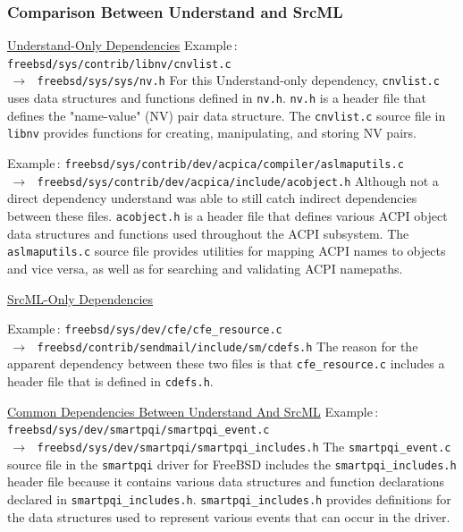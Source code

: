 \documentclass[12pt, dvipsnames, a4paper]{article}
\newcommand{\code}[1]{\texttt{#1}}
\begin{document}
		\subsubsection{Comparison Between Understand and SrcML}
		\underline{Understand-Only Dependencies}
		\newline
		\newline
		Example$\,\colon\,$\texttt{freebsd/sys/contrib/libnv/cnvlist.c \\$\,\to\,$ freebsd/sys/sys/nv.h}
		\newline
		\newline
		For this Understand-only dependency, \code{cnvlist.c} uses data structures and functions defined in \code{nv.h}. \code{nv.h} is a header file that defines the "name-value" (NV) pair data structure. The \code{cnvlist.c} source file in \code{libnv} provides functions for creating, manipulating, and storing NV pairs.

		Example$\,\colon\,$\texttt{freebsd/sys/contrib/dev/acpica/compiler/aslmaputils.c \\$\,\to\,$ freebsd/sys/contrib/dev/acpica/include/acobject.h}
		\newline
		\newline
		Although not a direct dependency understand was able to still catch indirect dependencies between these files. \code{acobject.h} is a header file that defines various ACPI object data structures and functions used throughout the ACPI subsystem. The \code{aslmaputils.c} source file provides utilities for mapping ACPI names to objects and vice versa, as well as for searching and validating ACPI namepaths.

		\underline{SrcML-Only Dependencies}

		Example$\,\colon\,$\texttt{freebsd/sys/dev/cfe/cfe\_resource.c \\$\,\to\,$ freebsd/contrib/sendmail/include/sm/cdefs.h}
		\newline
		\newline
		The reason for the apparent dependency between these two files is that \code{cfe\_resource.c} includes a header file that is defined in \code{cdefs.h}.


		\underline{Common Dependencies Between Understand And SrcML}
		\newline
		\newline
		Example$\,\colon\,$\texttt{freebsd/sys/dev/smartpqi/smartpqi\_event.c \\$\,\to\,$ freebsd/sys/dev/smartpqi/smartpqi\_includes.h}
		\newline
		\newline
		The \code{smartpqi\_event.c} source file in the \code{smartpqi} driver for FreeBSD includes the \code{smartpqi\_includes.h} header file because it contains various data structures and function declarations declared in \code{smartpqi\_includes.h}. \code{smartpqi\_includes.h}  provides definitions for the data structures used to represent various events that can occur in the driver.
\end{document}
